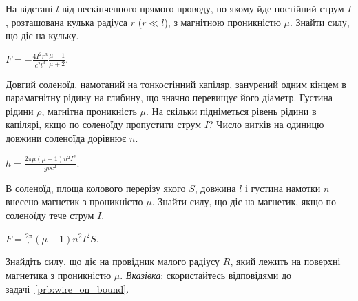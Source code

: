 \begin{problem}
На відстані $l$ від нескінченного прямого проводу, по якому
йде постійний струм $I$, розташована кулька радіуса
$r$ ($r \ll l$), з магнітною проникністю $\mu$. Знайти силу, що діє
на кульку.
\begin{solution}
	$F = - \frac{4I^2r^3}{c^2l^3}\frac{\mu - 1}{\mu + 2}$.
\end{solution}
\end{problem}

\begin{problem}
Довгий соленоїд, намотаний на тонкостінний капіляр, занурений одним кінцем в парамагнітну рідину на глибину, що значно перевищує його діаметр. Густина рідини $\rho$, магнітна проникність $\mu$. На скільки підніметься рівень рідини в капілярі, якщо по соленоїду пропустити струм $I$? Число витків на одиницю довжини соленоїда дорівнює $n$.
\begin{solution}
	$h = \frac{2\pi\mu(\mu - 1)n^2 I^2}{g\rho c^2}$.
\end{solution}
\end{problem}




\begin{problem} %
В соленоїд, площа колового перерізу якого $S$, довжина $l$ і густина намотки $n$ внесено магнетик з проникністю $\mu$. Знайти силу, що діє на магнетик, якщо по соленоїду тече струм $I$.
\begin{solution}
	$F = \frac{2\pi}{c} (\mu - 1) n^2 I^2S$.
\end{solution}
\end{problem}

\begin{problem}
    Знайдіть силу, що діє на провідник малого радіусу $R$, який лежить на поверхні магнетика з проникністю $\mu$. \emph{Вказівка}: скористайтесь відповідями до задачі~\ref{prb:wire_on_bound}.
\end{problem}

